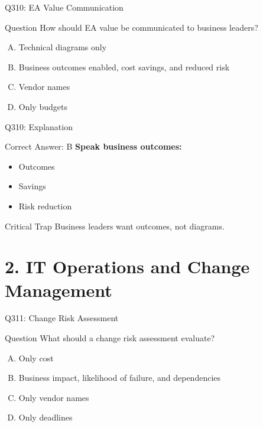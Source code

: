 \documentclass{beamer}
\begin{document}
	\begin{frame}{Q310: EA Value Communication}
		\begin{block}{Question}
			How should EA value be communicated to business leaders?
		\end{block}
		\begin{enumerate}[(A)]
			\item Technical diagrams only
			\item Business outcomes enabled, cost savings, and reduced risk
			\item Vendor names
			\item Only budgets
		\end{enumerate}
	\end{frame}
	
	\begin{frame}{Q310: Explanation}
		\begin{block}{Correct Answer: B}
			\textbf{Speak business outcomes:}
			\begin{itemize}
				\item Outcomes
				\item Savings
				\item Risk reduction
			\end{itemize}
		\end{block}
		\begin{alertblock}{Critical Trap}
			Business leaders want outcomes, not diagrams.
		\end{alertblock}
	\end{frame}
	
	\section{2. IT Operations and Change Management}
	
	\begin{frame}{Q311: Change Risk Assessment}
		\begin{block}{Question}
			What should a change risk assessment evaluate?
		\end{block}
		\begin{enumerate}[(A)]
			\item Only cost
			\item Business impact, likelihood of failure, and dependencies
			\item Only vendor names
			\item Only deadlines
		\end{enumerate}
	\end{frame}
	
\end{document}
